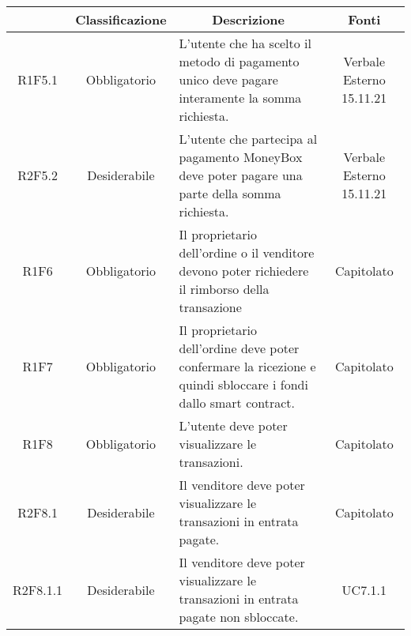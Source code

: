\begin{table}[H]
    \centering
    \renewcommand{\arraystretch}{1.8}
    \begin{tabular}{c | c | p{6cm} | c}
        \rowcolor[HTML]{125E28}
        \multicolumn{1}{c}{\color[HTML]{FFFFFF} \textbf{Codice}}          &
        \multicolumn{1}{c}{\color[HTML]{FFFFFF} \textbf{Classificazione}} &
        \multicolumn{1}{c}{\color[HTML]{FFFFFF} \textbf{Descrizione}}     &
        \multicolumn{1}{c}{\color[HTML]{FFFFFF} \textbf{Fonti}}                                                                                                                                                                             \\
        \hline
        R1F5.1                                                            & Obbligatorio & L'utente che ha scelto il metodo di pagamento unico deve pagare interamente la somma richiesta.                       & Verbale Esterno 15.11.21 \\
        R2F5.2                                                            & Desiderabile & L'utente che partecipa al pagamento MoneyBox\glo{} deve poter pagare una parte della somma richiesta.                 & Verbale Esterno 15.11.21 \\
        R1F6                                                              & Obbligatorio & Il proprietario dell'ordine o il venditore devono poter richiedere il rimborso della transazione                      & Capitolato               \\
        R1F7                                                              & Obbligatorio & Il proprietario dell'ordine deve poter confermare la ricezione e quindi sbloccare i fondi dallo smart contract\glo{}. & Capitolato               \\
        R1F8                                                              & Obbligatorio & L'utente deve poter visualizzare le transazioni.                                                                      & Capitolato               \\
        R2F8.1                                                            & Desiderabile & Il venditore deve poter visualizzare le transazioni in entrata pagate.                                                & Capitolato               \\
        R2F8.1.1                                                          & Desiderabile & Il venditore deve poter visualizzare le transazioni in entrata pagate non sbloccate.                                  & UC7.1.1                  \\

\end{tabular}
\end{table}

